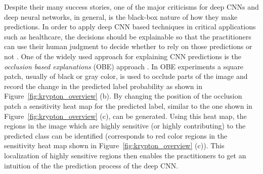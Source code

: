 Despite their many success stories, one of the major criticisms for deep CNNs and deep neural networks, in general, is the black-box nature of how they make predictions.
In order to apply deep CNN based techniques in critical applications such as healthcare, the decisions should be explainable so that the practitioners can use their human judgment to decide whether to rely on those predictions or not \cite{jung2017deep}.
One of the widely used approach for explaining CNN predictions is the \textit{occlusion based explanations} (OBE) approach \cite{zeiler2014visualizing}.
In OBE experiments a square patch, usually of black or gray color, is used to occlude parts of the image and record the change in the predicted label probability as shown in Figure~\ref{fig:krypton_overview} (b).
By changing the position of the occlusion patch a sensitivity heat map for the predicted label, similar to the one shown in Figure~\ref{fig:krypton_overview} (c), can be generated.
Using this heat map, the regions in the image which are highly sensitive (or highly contributing) to the predicted class can be identified (corresponds to red color regions in the sensitivity heat map shown in Figure~\ref{fig:krypton_overview} (c)).
This localization of highly sensitive regions then enables the practitioners to get an intuition of the the prediction process of the deep CNN.




